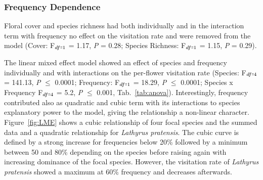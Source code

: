 \subsubsection*{Frequency Dependence}			
Floral cover and species richness had both individually and in the interaction term with frequency no effect on the visitation rate and were removed from the model (Cover: F$_{df\shorteq1}$ = 1.17, \textit{P} = 0.28; Species Richness: F$ _{df\shorteq1} $ = 1.15, \textit{P} = 0.29). 

The linear mixed effect model showed an effect of species and frequency individually and with interactions on the per-flower visitation rate (Species: F$_{df\shorteq4}$ = 141.13, \textit{P} $\leq$ 0.0001; Frequency: F$_{df\shorteq1}$ = 18.29, \textit{P} $\leq$ 0.0001; Species x Frequency F$_{ df\shorteq4}$ = 5.2, \textit{P} $\leq$ 0.001, Tab.~\ref{tab:anova}). Interestingly, frequency contributed also as quadratic and cubic term with its interactions to species explanatory power to the model, giving the relationship a non-linear character. Figure~\ref{fig:LME} shows a cubic relationship of four focal species and the summed data and a quadratic relationship for \textit{Lathyrus pratensis}. The cubic curve is defined by a strong increase for frequencies below 20\% followed by a minimum between 50 and 80\% depending on the species before raising again with increasing dominance of the focal species. However, the visitation rate of \textit{Lathyrus pratensis} showed a maximum at 60\% frequency and decreases afterwards. 

